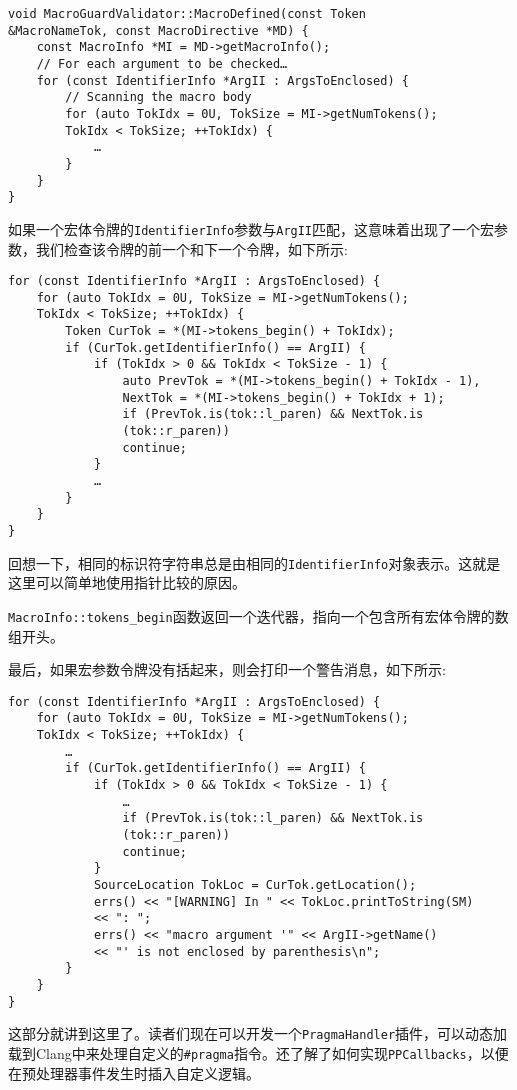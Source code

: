 \begin{lstlisting}[style=styleCXX]
void MacroGuardValidator::MacroDefined(const Token
&MacroNameTok, const MacroDirective *MD) {
	const MacroInfo *MI = MD->getMacroInfo();
	// For each argument to be checked…
	for (const IdentifierInfo *ArgII : ArgsToEnclosed) {
		// Scanning the macro body
		for (auto TokIdx = 0U, TokSize = MI->getNumTokens();
		TokIdx < TokSize; ++TokIdx) {
			…
		}
	}
}
\end{lstlisting}

如果一个宏体令牌的\texttt{IdentifierInfo}参数与\texttt{ArgII}匹配，这意味着出现了一个宏参数，我们检查该令牌的前一个和下一个令牌，如下所示:

\begin{lstlisting}[style=styleCXX]
for (const IdentifierInfo *ArgII : ArgsToEnclosed) {
	for (auto TokIdx = 0U, TokSize = MI->getNumTokens();
	TokIdx < TokSize; ++TokIdx) {
		Token CurTok = *(MI->tokens_begin() + TokIdx);
		if (CurTok.getIdentifierInfo() == ArgII) {
			if (TokIdx > 0 && TokIdx < TokSize - 1) {
				auto PrevTok = *(MI->tokens_begin() + TokIdx - 1),
				NextTok = *(MI->tokens_begin() + TokIdx + 1);
				if (PrevTok.is(tok::l_paren) && NextTok.is
				(tok::r_paren))
				continue;
			}
			…
		}
	}
}
\end{lstlisting}

\begin{tcolorbox}[colback=blue!5!white,colframe=blue!75!black, fonttitle=\bfseries,title=\texttt{IdentifierInfo}实例的唯一性]
\hspace*{0.7cm}回想一下，相同的标识符字符串总是由相同的\texttt{IdentifierInfo}对象表示。这就是这里可以简单地使用指针比较的原因。
\end{tcolorbox}

\texttt{MacroInfo::tokens\_begin}函数返回一个迭代器，指向一个包含所有宏体令牌的数组开头。

最后，如果宏参数令牌没有括起来，则会打印一个警告消息，如下所示:

\begin{lstlisting}[style=styleCXX]
for (const IdentifierInfo *ArgII : ArgsToEnclosed) {
	for (auto TokIdx = 0U, TokSize = MI->getNumTokens();
	TokIdx < TokSize; ++TokIdx) {
		…
		if (CurTok.getIdentifierInfo() == ArgII) {
			if (TokIdx > 0 && TokIdx < TokSize - 1) {
				…
				if (PrevTok.is(tok::l_paren) && NextTok.is
				(tok::r_paren))
				continue;
			}
			SourceLocation TokLoc = CurTok.getLocation();
			errs() << "[WARNING] In " << TokLoc.printToString(SM)
			<< ": ";
			errs() << "macro argument '" << ArgII->getName()
			<< "' is not enclosed by parenthesis\n";
		}
	}
}
\end{lstlisting}

这部分就讲到这里了。读者们现在可以开发一个\texttt{PragmaHandler}插件，可以动态加载到Clang中来处理自定义的\texttt{\#pragma}指令。还了解了如何实现\texttt{PPCallbacks}，以便在预处理器事件发生时插入自定义逻辑。

















